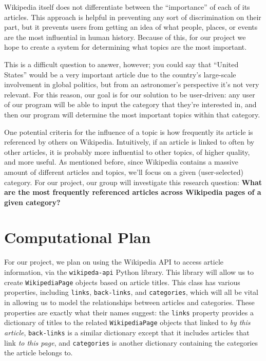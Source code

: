 \documentclass[fontsize=11pt]{article}
\begin{document}
Wikipedia itself does not differentiate between the ``importance'' of each of its articles. This approach is helpful in preventing any sort of discrimination on their part, but it prevents users from getting an idea of what people, places, or events are the most influential in human history. Because of this, for our project we hope to create a system for determining what topics are the most important.

This is a difficult question to answer, however; you could say that ``United States'' would be a very important article due to the country's large-scale involvement in global politics, but from an astronomer's perspective it's not very relevant. For this reason, our goal is for our solution to be user-driven: any user of our program will be able to input the category that they're interested in, and then our program will determine the most important topics within that category.

One potential criteria for the influence of a topic is how frequently its article is referenced by others on Wikipedia. Intuitively, if an article is linked to often by other articles, it is probably more influential to other topics, of higher quality, and more useful. As mentioned before, since Wikipedia contains a massive amount of different articles and topics, we'll focus on a given (user-selected) category. For our project, our group will investigate this research question:
\textbf{What are the most frequently referenced articles across Wikipedia pages of a given category?}

\section*{Computational Plan}



For our project, we plan on using the Wikipedia API to access article information, via the \texttt{wikipeda-api} Python library. This library will allow us to create \texttt{WikipediaPage} objects based on article titles. This class has various properties, including \texttt{links}, \texttt{back-links}, and \texttt{categories}, which will all be vital in allowing us to model the relationships between articles and categories. These properties are exactly what their names suggest: the \texttt{links} property provides a dictionary of titles to the related \texttt{WikipediaPage} objects that linked to \emph{by this article}, \texttt{back-links} is a similar dictionary except that it includes articles that link \emph{to this page}, and \texttt{categories} is another dictionary containing the categories the article belongs to.
\end{document}
